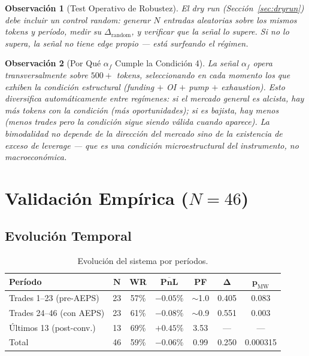 \documentclass[11pt,a4paper]{article}
\newtheorem{remark}{Observaci\'on}[section]
\newcommand{\af}{\alpha_f}
\begin{document}
\begin{remark}[Test Operativo de Robustez]
El dry run (Secci\'on~\ref{sec:dryrun}) debe incluir un control
random: generar $N$ entradas aleatorias sobre los mismos tokens y
per\'iodo, medir su $\Delta_{\text{random}}$, y verificar que la
se\~nal lo supere. Si no lo supera, la se\~nal no tiene edge propio
--- est\'a surfeando el r\'egimen.
\end{remark}

\begin{remark}[Por Qu\'e $\af$ Cumple la Condici\'on 4]
La se\~nal $\af$ opera transversalmente sobre $500+$ tokens,
seleccionando en cada momento los que exhiben la condici\'on
estructural (funding $+$ OI $+$ pump $+$ exhaustion). Esto
diversifica autom\'aticamente entre reg\'imenes: si el mercado
general es alcista, hay m\'as tokens con la condici\'on (m\'as
oportunidades); si es bajista, hay menos (menos trades pero la
condici\'on sigue siendo v\'alida cuando aparece). La bimodalidad
no depende de la direcci\'on del mercado sino de la existencia
de exceso de leverage --- que es una condici\'on microestructural
del instrumento, no macroecon\'omica.
\end{remark}


\section{Validaci\'on Emp\'irica ($N=46$)}
\label{sec:validation}

\subsection{Evoluci\'on Temporal}

\begin{table}[H]
\centering
\caption{Evoluci\'on del sistema por per\'iodos.}
\begin{tabular}{lcccccc}
\toprule
\textbf{Per\'iodo} & $\bm{N}$ & \textbf{WR} & $\overline{\textbf{PnL}}$ &
  \textbf{PF} & $\bm{\Delta}$ & $\bm{p}_{\text{MW}}$ \\
\midrule
Trades 1--23 (pre-AEPS) & 23 & 57\% & $-0.05\%$ & $\sim$1.0 & 0.405 & 0.083 \\
Trades 24--46 (con AEPS) & 23 & 61\% & $-0.08\%$ & $\sim$0.9 & 0.551 & 0.003 \\
\'Ultimos 13 (post-conv.) & 13 & 69\% & $+0.45\%$ & 3.53 & --- & --- \\
\midrule
Total & 46 & 59\% & $-0.06\%$ & 0.99 & 0.250 & 0.000315 \\
\bottomrule
\end{tabular}
\end{table}
\end{document}
